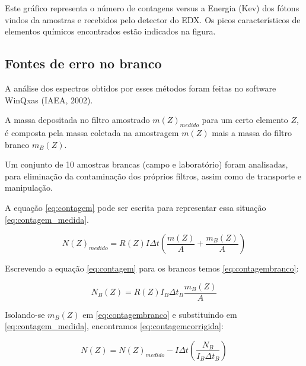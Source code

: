 

Este gráfico representa o número de contagens  versus a Energia (Kev) dos 	fótons vindos da amostras e recebidos pelo detector do EDX. Os picos 	característicos de elementos químicos encontrados estão indicados na figura.

\subsection{Fontes de erro no branco}



A análise dos espectros obtidos por esses métodos foram feitas no software WinQxas (IAEA, 2002).

A massa depositada no filtro amostrado $m(Z)_{medido}$ para um certo 
elemento $Z$, é composta pela massa coletada na amostragem $m(Z)$ 
mais a massa do filtro branco $m_{B}(Z)$. 

Um conjunto de 10 amostras brancas (campo e laboratório) foram analisadas, 
para eliminação da contaminação dos próprios filtros, assim como de 
transporte e manipulação.

A equação \ref{eq:contagem} pode ser escrita para representar essa situação
\ref{eq:contagem_medida}. 

\begin{equation}
  \label{eq:contagem_medida}
  N(Z)_{medido} = R(Z) I\Delta t \left( \frac{m(Z)}{A} + \frac{m_B(Z)}{A} \right)
\end{equation}  

Escrevendo a equação \ref{eq:contagem} para os brancos temos \ref{eq:contagembranco}:

\begin{equation}
  \label{eq:contagembranco}
  N_B(Z) = R(Z) I_B\Delta t_B \frac{m_B(Z)}{A}
\end{equation}

Isolando-se $m_B(Z)$ em \ref{eq:contagembranco} e substituindo em 
\ref{eq:contagem_medida}, encontramos \ref{eq:contagemcorrigida}:
 
\begin{equation}
  \label{eq:contagemcorrigida}
  N(Z) = N(Z)_{medido} - I\Delta t \left( \frac{N_B}{I_B \Delta t_B} \right)
\end{equation}


